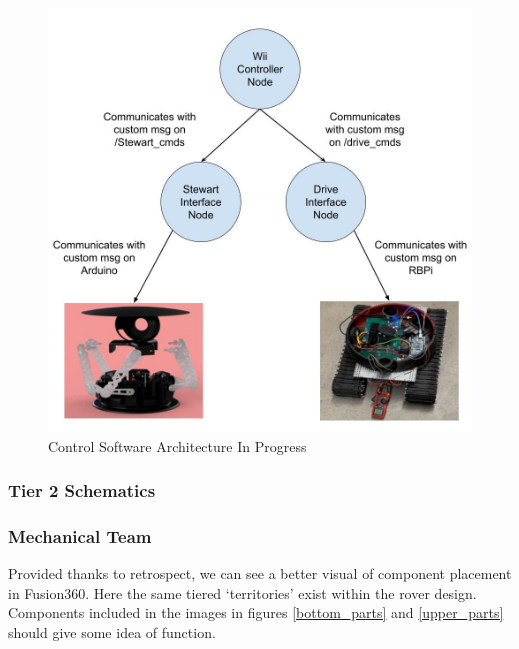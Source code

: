 \documentclass[a4paper, 10pt]{article}
\begin{document}
		\begin{figure} [!h]
			\centering
			\includegraphics[scale=0.35]{Photos/Control Software Architecture Actual}
			\caption{Control Software Architecture In Progress}
			\label{Actual Control Architecture}
		\end{figure}
\pagebreak
\clearpage
\newpage
	\subsubsection{Tier 2 Schematics}
		\subsubsection*{Mechanical Team}
		Provided thanks to retrospect, we can see a better visual of component placement in Fusion360. Here the same tiered `territories' exist within the rover design. Components included in the images in figures \ref{bottom_parts} and \ref{upper_parts} should give some idea of function.
		
\end{document}
